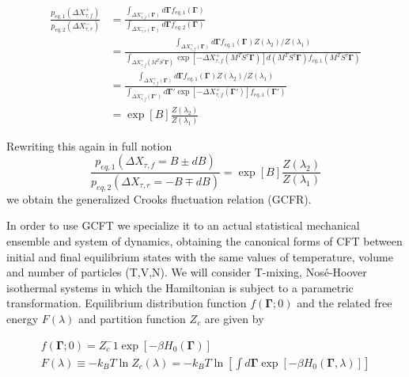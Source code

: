 \documentclass[a4paper,12pt]{article}
\begin{document}
\begin{equation}
\begin{aligned}
\frac{p_{eq,1}(\Delta X_{\tau,f}^+)}{p_{eq,2}(\Delta X_{\tau,r}^-)}
&=\frac{\int_{\Delta X_{\tau,f}^+(\bm{\Gamma})} d\bm{\Gamma} f_{eq,1}(\bm{\Gamma})}{\int_{\Delta X_{\tau,r}^-(\bm{\Gamma})} d\bm{\Gamma} f_{eq,2}(\bm{\Gamma})} \\
&= \frac{\int_{\Delta X_{\tau,f}^+(\bm{\Gamma})} d\bm{\Gamma} f_{eq,1}(\bm{\Gamma})Z(\lambda_2)/Z(\lambda_1)}{\int_{\Delta X_{\tau,f}^+(M^T S^{\tau}\bm{\Gamma})} \exp[-\Delta X_{\tau,f}^+(M^T S^{\tau}\bm{\Gamma})] d(M^T S^{\tau}\bm{\Gamma}) f_{eq,1}(M^T S^{\tau}\bm{\Gamma})} \\
&=\frac{\int_{\Delta X_{\tau,f}^+(\bm{\Gamma})} d\bm{\Gamma} f_{eq,1}(\bm{\Gamma}) Z(\lambda_2)/Z(\lambda_1)}{\int_{\Delta X_{\tau,f}^+(\bm{\Gamma}')} d\bm{\Gamma}' \exp[-\Delta X_{\tau,f}^+(\bm{\Gamma}')] f_{eq,1}(\bm{\Gamma}')} \\
&= \exp[B] \frac{Z(\lambda_2)}{Z(\lambda_1)}
\end{aligned}
\end{equation}

Rewriting this again in full notion
\begin{equation}
\label{GCFR}
\frac{p_{eq,1}(\Delta X_{\tau,f}=B\pm dB)}{p_{eq,2}(\Delta X_{\tau,r}=-B\mp dB)}= \exp[B] \frac{Z(\lambda_2)}{Z(\lambda_1)}
\end{equation}
we obtain the generalized Crooks fluctuation relation (GCFR).

In order to use GCFT we specialize it to an actual statistical mechanical ensemble and system of dynamics, obtaining the canonical forms of CFT between initial and final equilibrium states with the same values of temperature, volume and number of particles (T,V,N). We will consider T-mixing, Nosé-Hoover isothermal systems in which the Hamiltonian is subject to a parametric transformation. Equilibrium distribution function $f(\bm{\Gamma};0)$ and the related free energy $F(\lambda)$ and partition function $Z_c$ are given by

\begin{equation}
\begin{aligned}
  f(\bm{\Gamma};0)=Z_c^-1 \exp[-\beta H_0(\bm{\Gamma})]\\
  F(\lambda)\equiv - k_B T \ln Z_c(\lambda) = -k_B T \ln[\int d\bm{\Gamma} \exp[-\beta H_0(\bm{\Gamma},\lambda)]]
\end{aligned}
\end{equation}
\end{document}
